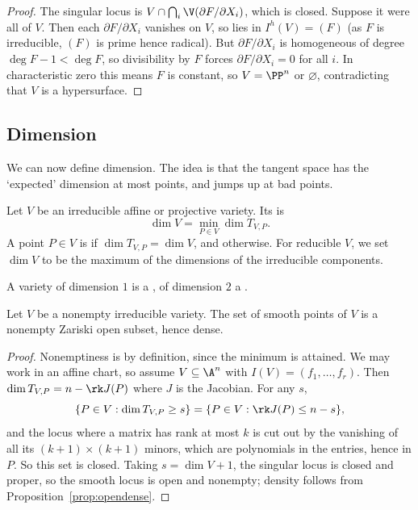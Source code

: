 \begin{proof}
	The singular locus is $V \cap \bigcap_i \V(\partial F/\partial X_i)$, which is closed. Suppose it were all of $V$. Then each $\partial F/\partial X_i$ vanishes on $V$, so lies in $I^h(V) = (F)$ (as $F$ is irreducible, $(F)$ is prime hence radical). But $\partial F/\partial X_i$ is homogeneous of degree $\deg F - 1 < \deg F$, so divisibility by $F$ forces $\partial F/\partial X_i = 0$ for all $i$. In characteristic zero this means $F$ is constant, so $V = \PP^n$ or $\varnothing$, contradicting that $V$ is a hypersurface.
\end{proof}

\subsection{Dimension}

We can now define dimension. The idea is that the tangent space has the `expected' dimension at most points, and jumps up at bad points.

\begin{definition}[Dimension]
	Let $V$ be an irreducible affine or projective variety. Its  is
	$$\dim V = \min_{P \in V} \dim T_{V,P}.$$
	A point $P \in V$ is  if $\dim T_{V,P} = \dim V$, and  otherwise. For reducible $V$, we set $\dim V$ to be the maximum of the dimensions of the irreducible components.
\end{definition}

A variety of dimension $1$ is a , of dimension $2$ a .

\begin{theorem}\label{thm:smoothopen}
	Let $V$ be a nonempty irreducible variety. The set of smooth points of $V$ is a nonempty Zariski open subset, hence dense.
\end{theorem}

\begin{proof}
	Nonemptiness is by definition, since the minimum is attained. We may work in an affine chart, so assume $V \subseteq \A^n$ with $I(V) = (f_1,\dots,f_r)$. Then $\dim T_{V,P} = n - \rk J(P)$ where $J$ is the Jacobian. For any $s$,
	$$\{P \in V : \dim T_{V,P} \geq s\} = \{P \in V : \rk J(P) \leq n - s\},$$
	and the locus where a matrix has rank at most $k$ is cut out by the vanishing of all its $(k+1)\times(k+1)$ minors, which are polynomials in the entries, hence in $P$. So this set is closed. Taking $s = \dim V + 1$, the singular locus is closed and proper, so the smooth locus is open and nonempty; density follows from Proposition~\ref{prop:opendense}.
\end{proof}

